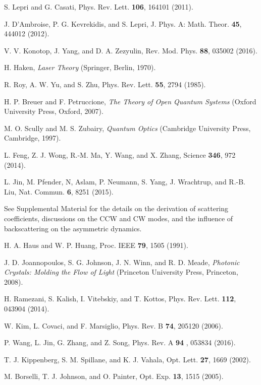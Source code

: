 \documentclass[prl,showpacs,superscriptaddress,twocolumn]{revtex4-1}
\begin{document}
\begin{thebibliography}{999}
 S. Lepri and G. Casati, Phys. Rev. Lett. \textbf{106},
164101 (2011).

 J. D'Ambroise, P. G. Kevrekidis, and S. Lepri, J. Phys. A:
Math. Theor. \textbf{45}, 444012 (2012).

 V. V. Konotop, J. Yang, and D. A. Zezyulin, Rev. Mod. Phys.
\textbf{88}, 035002 (2016).

 H. Haken, \textit{Laser Theory} (Springer, Berlin, 1970).

 R. Roy, A. W. Yu, and S. Zhu, Phys. Rev. Lett. \textbf{55},
2794 (1985).

 H. P. Breuer and F. Petruccione, \textit{The Theory of Open
Quantum Systems} (Oxford University Press, Oxford, 2007).

 M. O. Scully and M. S. Zubairy, \textit{Quantum Optics}
(Cambridge University Press, Cambridge, 1997).

 L. Feng, Z. J. Wong, R.-M. Ma, Y. Wang, and X. Zhang,
Science \textbf{346}, 972 (2014).

 L. Jin, M. Pfender, N, Aslam, P. Neumann, S. Yang, J.
Wrachtrup, and R.-B. Liu, Nat. Commun. \textbf{6}, 8251 (2015).


 See Supplemental Material for the details on the
derivation of scattering coefficients, discussions on the CCW and CW modes,
and the influence of backscattering on the asymmetric dynamics.

 H. A. Haus and W. P. Huang, Proc. IEEE \textbf{79}, 1505
(1991).

 J. D. Joannopoulos, S. G. Johnson, J. N. Winn, and R.
D. Meade, \textit{Photonic Crystals: Molding the Flow of Light} (Princeton
University Press, Princeton, 2008).


 H. Ramezani, S. Kalish, I. Vitebskiy, and T. Kottos,
Phys. Rev. Lett. \textbf{112}, 043904 (2014).

 W. Kim, L. Covaci, and F. Marsiglio, Phys. Rev. B \textbf{74},
205120 (2006).

 P. Wang, L. Jin, G. Zhang, and Z. Song, Phys. Rev. A \textbf{94}%
, 053834 (2016).

 T. J. Kippenberg, S. M. Spillane, and K. J. Vahala, Opt. Lett.
\textbf{27}, 1669 (2002).

 M. Borselli, T. J. Johnson, and O. Painter, Opt. Exp.
\textbf{13}, 1515 (2005).


\end{thebibliography}
\end{document}
